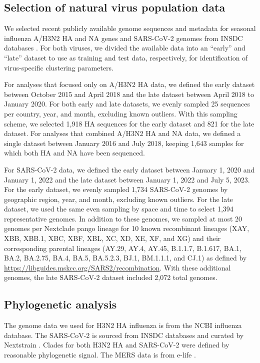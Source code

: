 \documentclass[10pt,letterpaper]{article}
\begin{document}
\subsection*{Selection of natural virus population data}

We selected recent publicly available genome sequences and metadata for seasonal influenza A/H3N2 HA and NA genes and SARS-CoV-2 genomes from INSDC databases \cite{Arita2021}.
For both viruses, we divided the available data into an ``early'' and ``late'' dataset to use as training and test data, respectively, for identification of virus-specific clustering parameters.

For analyses that focused only on A/H3N2 HA data, we defined the early dataset between October 2015 and April 2018 and the late dataset between April 2018 to January 2020.
For both early and late datasets, we evenly sampled 25 sequences per country, year, and month, excluding known outliers.
With this sampling scheme, we selected 1,918 HA sequences for the early dataset and 821 for the late dataset.
For analyses that combined A/H3N2 HA and NA data, we defined a single dataset between January 2016 and July 2018, keeping 1,643 samples for which both HA and NA have been sequenced.

For SARS-CoV-2 data, we defined the early dataset between January 1, 2020 and January 1, 2022 and the late dataset between January 1, 2022 and July 5, 2023.
For the early dataset, we evenly sampled 1,734 SARS-CoV-2 genomes by geographic region, year, and month, excluding known outliers.
For the late dataset, we used the same even sampling by space and time to select 1,394 representative genomes.
In addition to these genomes, we sampled at most 20 genomes per Nextclade pango lineage for 10 known recombinant lineages (XAY, XBB, XBB.1, XBC, XBF, XBL, XC, XD, XE, XF, and XG) and their corresponding parental lineages (AY.29, AY.4, AY.45, B.1.1.7, B.1.617, BA.1, BA.2, BA.2.75, BA.4, BA.5, BA.5.2.3, BJ.1, BM.1.1.1, and CJ.1) as defined by \href{https://libguides.mskcc.org/SARS2/recombination}{https://libguides.mskcc.org/SARS2/recombination}.
With these additional genomes, the late SARS-CoV-2 dataset included 2,072 total genomes.

\subsection*{Phylogenetic analysis}

The genome data we used for H3N2 HA influenza is from the NCBI influenza database.
The SARS-CoV-2 is sourced from INSDC databases and curated by Nextstrain \cite{Hadfield2018}.
Clades for both H3N2 HA and SARS-CoV-2 were defined by reasonable phylogenetic signal.
The MERS data is from e-life \cite{dudas_carvalho_rambaut_bedford_2018}.
\end{document}
